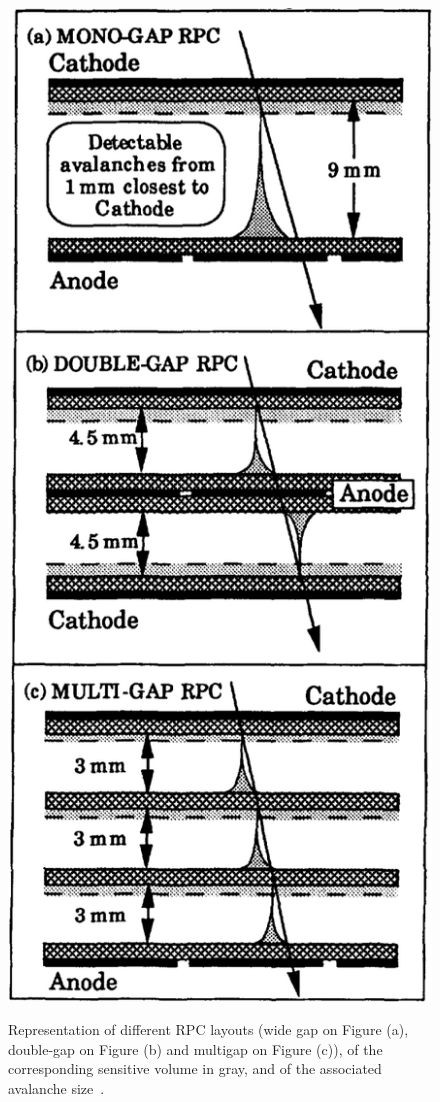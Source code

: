 	\begin{figure}[H]
		\centering
		\includegraphics[width = 0.5\plotwidth]{fig/chapt4/RPC-layouts-dyn-range.png}\\
		\caption{\label{fig:RPClayouts} Representation of different RPC layouts (wide gap on Figure (a), double-gap on Figure (b) and multigap on Figure (c)), of the corresponding sensitive volume in gray, and of the associated avalanche size~\cite{WILLIAMS98}.}
	\end{figure}
	
